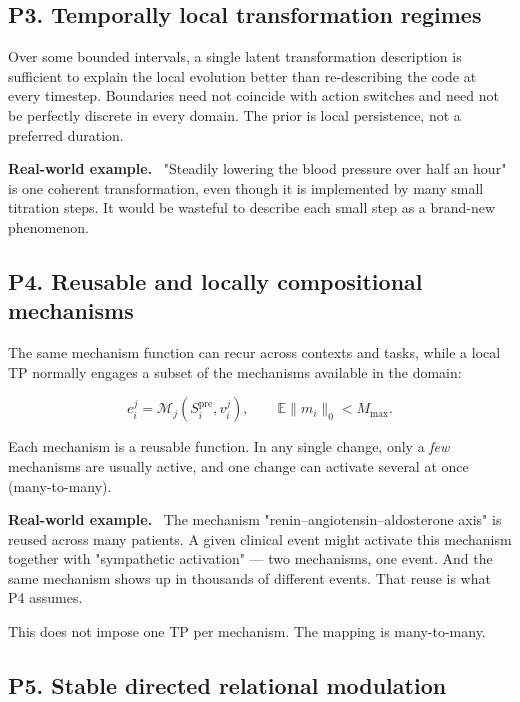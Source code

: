 \documentclass[11pt]{article}
\newenvironment{plainword}{%
  \par\medskip\noindent\begin{minipage}{\textwidth}%
  \color{gray!75!black}\small\itshape
}{%
  \end{minipage}\par\medskip}
\newenvironment{example}{%
  \par\smallskip\noindent\begin{minipage}{\textwidth}%
  \color{teal!60!black}\small
  \textbf{\color{teal!70!black}Real-world example.}\
}{%
  \end{minipage}\par\smallskip}
\begin{document}
\subsection*{P3. Temporally local transformation regimes}

Over some bounded intervals, a single latent transformation description is sufficient to explain the local evolution better than
re-describing the code at every timestep. Boundaries need not coincide with action switches and need not be perfectly discrete in
every domain. The prior is local persistence, not a preferred duration.

\begin{example}
"Steadily lowering the blood pressure over half an hour" is one coherent transformation, even though it is implemented by many
small titration steps. It would be wasteful to describe each small step as a brand-new phenomenon.
\end{example}

\subsection*{P4. Reusable and locally compositional mechanisms}

The same mechanism function can recur across contexts and tasks, while a local TP normally engages a subset of the mechanisms
available in the domain:

\[
\boxed{e_i^j=\mathcal M_j(S_i^{\mathrm{pre}},v_i^j),\qquad
\mathbb E\|m_i\|_0<M_{\max}.}
\]

\begin{plainword}
Each mechanism is a reusable function. In any single change, only a \emph{few} mechanisms are usually active, and one change can
activate several at once (many-to-many).
\end{plainword}

\begin{example}
The mechanism "renin--angiotensin--aldosterone axis" is reused across many patients. A given clinical event might activate this
mechanism together with "sympathetic activation" --- two mechanisms, one event. And the same mechanism shows up in thousands of
different events. That reuse is what P4 assumes.
\end{example}

This does not impose one TP per mechanism. The mapping is many-to-many.

\subsection*{P5. Stable directed relational modulation}
\end{document}
